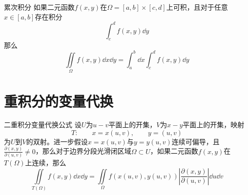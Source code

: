 \documentclass[lang = cn, scheme = chinese, thmcnt = section]{elegantbook}
\newcommand{\sub}{\subset}             %
\begin{document}
\begin{theorem}{累次积分}
	如果二元函数$f(x,y)$在$\Omega=[a,b]\times [c,d]$上可积，且对于任意$x\in [a,b]$存在积分
	$$
	\int_{c}^{d}f(x,y)\dd y
	$$
	那么
	$$
	\iint\limits_{\Omega}f(x,y)\dd x\dd y
	=\int_{a}^{b}\dd x\int_{c}^{d}f(x,y)\dd y
	$$
\end{theorem}

\section{重积分的变量代换}

\begin{theorem}{二重积分变量代换公式}
	设$U$为$u-v$平面上的开集，$V$为$x-y$平面上的开集，映射
	$$
	T:\qquad
	x=x(u,v),\qquad y=(u,v)
	$$
	为$U$到$V$的双射。进一步假设$x=x(u,v)$与$y=y(u,v)$连续可偏导，且$\frac{\partial (x,y)}{\partial (u,v)}\ne 0$，那么对于边界分段光滑闭区域$\Omega\sub U$，如果二元函数$f(x,y)$在$T(\Omega)$上连续，那么
	$$
	\iint\limits_{T(\Omega)}f(x,y)\dd x\dd y
	=\iint\limits_{\Omega}f(x(u,v),y(u,v))\left| \frac{\partial (x,y)}{\partial (u,v)} \right|\dd u\dd v
	$$
\end{theorem}
\end{document}
